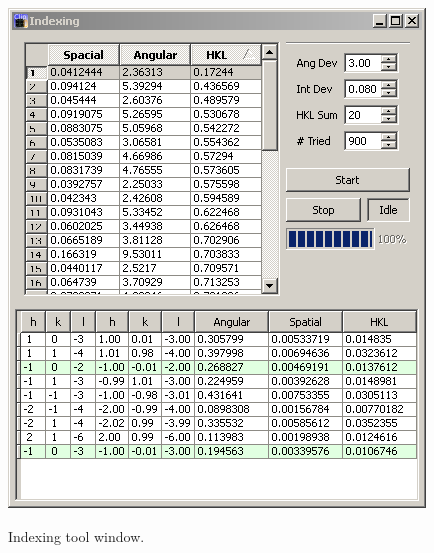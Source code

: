 \begin{figure}[htb]
  \centering
  \begin{minipage}[b]{0.45\textwidth}
    \includegraphics[width=\textwidth]{clip/Tool_Index}
    \label{Clip:FigToolIndex}
    \caption{Indexing tool window.}
  \end{minipage}
  \imgspace{}
  \begin{minipage}[b]{0.35\textwidth}

\end{minipage}
\end{figure}
